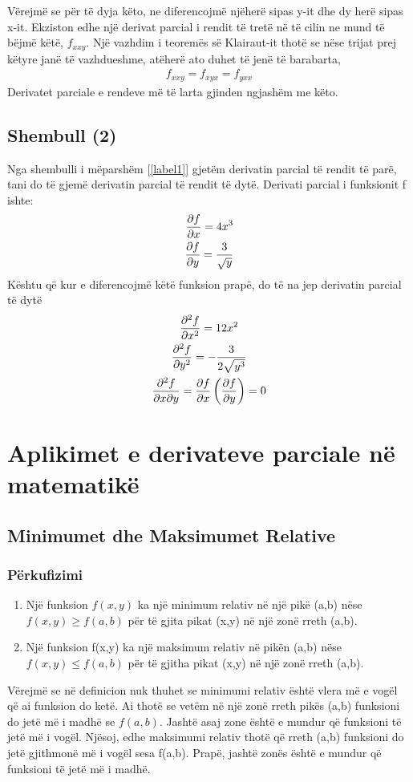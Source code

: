 \documentclass[a4paper]{article}
\begin{document}
Vërejmë se për të dyja këto, ne diferencojmë njëherë sipas y-it dhe dy herë sipas x-it. Ekziston edhe një derivat parcial i rendit të tretë në të cilin ne mund të bëjmë këtë, $f_{x x y}$. Një vazhdim i teoremës së Klairaut-it thotë se nëse trijat prej këtyre janë të vazhdueshme, atëherë ato duhet të jenë të barabarta,
\begin{align*}
	f_{x x y} = f_{x y x} = f_{y x x}
\end{align*}
Derivatet parciale e rendeve më të larta gjinden ngjashëm me këto.

\subsection{Shembull (2)}
Nga shembulli i mëparshëm [\ref{label1}] gjetëm derivatin parcial të rendit të parë, tani do të gjemë derivatin parcial të rendit të dytë.
Derivati parcial i funksionit f ishte:
\begin{align*}
	\pdv{f}{x}=4x^3 \\
	\pdv{f}{y}=\frac{3}{\sqrt{y} }
\end{align*}
Kështu që kur e diferencojmë këtë funksion prapë, do të na jep derivatin parcial të dytë
\begin{gather*}
	\pdv[2]{f}{x}= 12x^2 \\
	\pdv[2]{f}{y}= -\frac{3}{2\sqrt{y^3}}\\
	\pdv{f}{x}{y}= \pdv{f}{x}\left( \pdv{f}{y} \right) = 0
\end{gather*}
\newpage

\section{Aplikimet e derivateve parciale në matematikë}

\subsection{Minimumet dhe Maksimumet Relative}

\subsubsection{Përkufizimi}
\begin{enumerate}
	\item Një funksion $f(x,y)$ ka një minimum relativ në një pikë (a,b) nëse $f(x,y) \geq f(a,b)$ për të gjita pikat (x,y) në një zonë rreth (a,b).
	\item Një funksion f(x,y) ka një maksimum relativ në pikën (a,b) nëse $f(x,y) \leq f(a,b)$ për të gjitha pikat (x,y) në një zonë rreth (a,b).
\end{enumerate}
Vërejmë se në definicion nuk thuhet se minimumi relativ është vlera më e vogël që ai funksion do ketë. Ai thotë se vetëm në një zonë rreth pikës (a,b) funksioni do jetë më i madhë se $f(a,b)$. Jashtë asaj zone është e mundur që funksioni të jetë më i vogël. Njësoj, edhe maksimumi relativ thotë që rreth (a,b) funksioni do jetë gjithmonë më i vogël sesa f(a,b). Prapë, jashtë zonës është e mundur që funksioni të jetë më i madhë.
\end{document}
